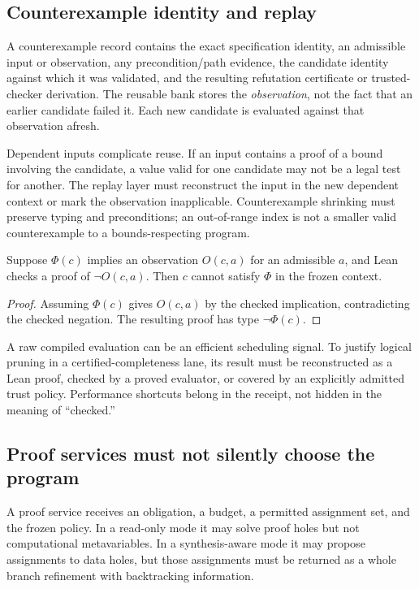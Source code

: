 \subsection{Counterexample identity and replay}

A counterexample record contains the exact specification identity, an admissible input or observation, any precondition/path evidence, the candidate identity against which it was validated, and the resulting refutation certificate or trusted-checker derivation. The reusable bank stores the \emph{observation}, not the fact that an earlier candidate failed it. Each new candidate is evaluated against that observation afresh.

Dependent inputs complicate reuse. If an input contains a proof of a bound involving the candidate, a value valid for one candidate may not be a legal test for another. The replay layer must reconstruct the input in the new dependent context or mark the observation inapplicable. Counterexample shrinking must preserve typing and preconditions; an out-of-range index is not a smaller valid counterexample to a bounds-respecting program.

\begin{proposition}
Suppose $\Phi(c)$ implies an observation $O(c,a)$ for an admissible $a$, and Lean checks a proof of $\neg O(c,a)$. Then $c$ cannot satisfy $\Phi$ in the frozen context.
\end{proposition}
\begin{proof}
Assuming $\Phi(c)$ gives $O(c,a)$ by the checked implication, contradicting the checked negation. The resulting proof has type $\neg\Phi(c)$.
\end{proof}

A raw compiled evaluation can be an efficient scheduling signal. To justify logical pruning in a certified-completeness lane, its result must be reconstructed as a Lean proof, checked by a proved evaluator, or covered by an explicitly admitted trust policy. Performance shortcuts belong in the receipt, not hidden in the meaning of ``checked.''

\subsection{Proof services must not silently choose the program}

A proof service receives an obligation, a budget, a permitted assignment set, and the frozen policy. In a read-only mode it may solve proof holes but not computational metavariables. In a synthesis-aware mode it may propose assignments to data holes, but those assignments must be returned as a whole branch refinement with backtracking information.

